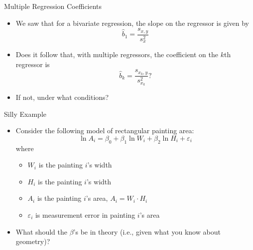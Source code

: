 \documentclass[english,xcolor={dvipsnames},aspectratio=169]{beamer}
\begin{document}


\begin{frame}{Multiple Regression Coefficients}
	\begin{itemize}
\item We saw that for a bivariate regression, the slope on the regressor is given by
\[
\hat{b}_1 =\frac{s_{x,y}}{s_{x}^{2}} 
\]

\medskip
\item Does it follow that, with multiple regressors, the coefficient on the $k$th regressor is
\[
\hat{b}_k =\frac{s_{x_{k},y}}{s_{x_{k}}^{2}} ?
\]

\medskip
\item If not, under what conditions?

\end{itemize}
\end{frame}


\begin{frame}{Silly Example}
	\begin{itemize}
	\item Consider the following model of rectangular painting area:\[
	\ln A_{i} = \beta_0 + \beta_{1} \ln W_{i} + \beta_{2} \ln H_{i} + \varepsilon_{i}
	\]
	where 
	\begin{itemize}
		\item $W_{i}$ is the painting $i$'s width
		\item $H_{i}$ is the painting $i$'s width
		\item $A_{i}$ is the painting $i$'s area, $A_{i} =W_{i} \cdot H_{i} $
		\item $\varepsilon_i$ is measurement error in painting $i$'s area
	\end{itemize}

	\medskip
	\item What should the $\beta$'s be in theory (i.e., given what you know about geometry)?
\end{itemize}
\end{frame}
\end{document}
